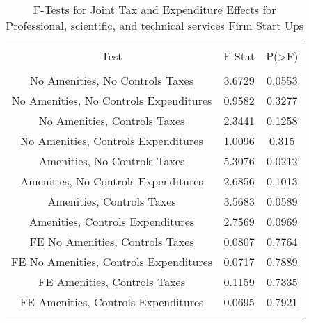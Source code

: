 
\begin{table}[!htbp] \centering 
  \caption{F-Tests for Joint Tax and Expenditure Effects for Professional, scientific, and technical services Firm Start Ups} 
  \label{54Ftests} 
\begin{tabular}{@{\extracolsep{5pt}} ccc} 
\\[-1.8ex]\hline 
\hline \\[-1.8ex] 
Test & F-Stat & P(\textgreater F) \\ 
\hline \\[-1.8ex] 
No Amenities, No Controls Taxes & 3.6729 & 0.0553 \\ 
No Amenities, No Controls Expenditures & 0.9582 & 0.3277 \\ 
No Amenities, Controls Taxes & 2.3441 & 0.1258 \\ 
No Amenities, Controls Expenditures & 1.0096 & 0.315 \\ 
Amenities, No Controls Taxes & 5.3076 & 0.0212 \\ 
Amenities, No Controls Expenditures & 2.6856 & 0.1013 \\ 
Amenities, Controls Taxes & 3.5683 & 0.0589 \\ 
Amenities, Controls Expenditures & 2.7569 & 0.0969 \\ 
FE No Amenities, Controls Taxes & 0.0807 & 0.7764 \\ 
FE No Amenities, Controls Expenditures & 0.0717 & 0.7889 \\ 
FE Amenities, Controls Taxes & 0.1159 & 0.7335 \\ 
FE Amenities, Controls Expenditures & 0.0695 & 0.7921 \\ 
\hline \\[-1.8ex] 
\end{tabular} 
\end{table} 
